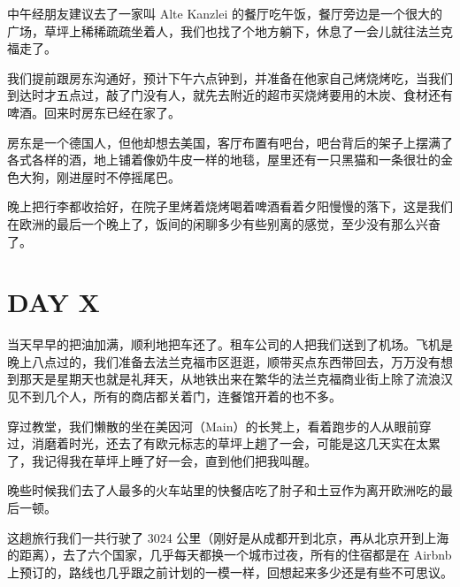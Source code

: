 \documentclass{ctexart}
\newcommand{\IMG}[1]{
	\begin{center}
	\makebox[\textwidth][c]{\texttt{[image: \#1]}}
	\end{center}
}
\newcommand{\SECTION}[1]{
	\section*{#1}\addcontentsline{toc}{0}{#1}
}
\begin{document}
中午经朋友建议去了一家叫 Alte Kanzlei 的餐厅吃午饭，餐厅旁边是一个很大的广场，草坪上稀稀疏疏坐着人，我们也找了个地方躺下，休息了一会儿就往法兰克福走了。

我们提前跟房东沟通好，预计下午六点钟到，并准备在他家自己烤烧烤吃，当我们到达时才五点过，敲了门没有人，就先去附近的超市买烧烤要用的木炭、食材还有啤酒。回来时房东已经在家了。

房东是一个德国人，但他却想去美国，客厅布置有吧台，吧台背后的架子上摆满了各式各样的酒，地上铺着像奶牛皮一样的地毯，屋里还有一只黑猫和一条很壮的金色大狗，刚进屋时不停摇尾巴。

晚上把行李都收拾好，在院子里烤着烧烤喝着啤酒看着夕阳慢慢的落下，这是我们在欧洲的最后一个晚上了，饭间的闲聊多少有些别离的感觉，至少没有那么兴奋了。

\newpage
\SECTION{DAY X}

当天早早的把油加满，顺利地把车还了。租车公司的人把我们送到了机场。飞机是晚上八点过的，我们准备去法兰克福市区逛逛，顺带买点东西带回去，万万没有想到那天是星期天也就是礼拜天，从地铁出来在繁华的法兰克福商业街上除了流浪汉见不到几个人，所有的商店都关着门，连餐馆开着的也不多。

穿过教堂，我们懒散的坐在美因河（Main）的长凳上，看着跑步的人从眼前穿过，消磨着时光，还去了有欧元标志的草坪上趟了一会，可能是这几天实在太累了，我记得我在草坪上睡了好一会，直到他们把我叫醒。

晚些时候我们去了人最多的火车站里的快餐店吃了肘子和土豆作为离开欧洲吃的最后一顿。

\IMG{eu61.jpg}

这趟旅行我们一共行驶了 3024 公里（刚好是从成都开到北京，再从北京开到上海的距离），去了六个国家，几乎每天都换一个城市过夜，所有的住宿都是在 Airbnb 上预订的，路线也几乎跟之前计划的一模一样，回想起来多少还是有些不可思议。

\end{document}
